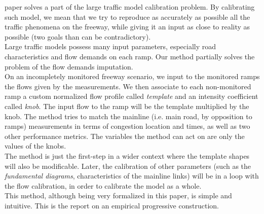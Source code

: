  paper solves a part of the large traffic model calibration problem. By calibrating such model, we mean that we try to reproduce as accurately as possible all the traffic phenomena on the freeway, while giving it an input as close to reality as possible (two goals than can be contradictory).\\
Large traffic models possess many input parameters, especially road characteristics and flow demands on each ramp. Our method partially solves the problem of the flow demands imputation.\\
On an incompletely monitored freeway scenario, we input to the monitored ramps the flows given by the measurements. We then associate to each non-monitored ramp a custom normalized flow profile called \emph{template} and an intensity coefficient called \emph{knob}. The input flow to the ramp will be the template multiplied by the knob. The method tries to match the mainline (i.e. main road, by opposition to ramps) measurements in terms of congestion location and times, as well as two other performance metrics. The variables the method can act on are only the values of the knobs.\\
The method is just the first-step in a wider context where the template shapes will also be modificable. Later, the calibration of other parameters (such as the \emph{fundamental diagrams}, characteristics of the mainline links) will be in a loop with the flow calibration, in order to calibrate the model as a whole.\\
This method, although being very formalized in this paper, is simple and intuitive. This is the report on an empirical progressive construction.
	
